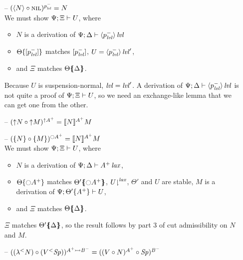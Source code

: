 \begin{itemize}
\item[--] $(\subst{\tetan{N}}{\tnil})^{p^-_\mlvl} = N$\smallskip\\
   We must show $\foc{\Psi}{\Xi}{U}$, where
   \begin{itemize}
   \item $N$ is a derivation of $\foc{\Psi}{\Delta}{\islvl{\susp{p^-_\mlvl}}}$
   \item $\tackon{\Theta}{[p^-_\mlvl]}$ matches $[p^-_\mlvl]$,
      $U = \islvl{\susp{p^-_\mlvl}}'$,
   \item and $\Xi$ matches $\frameoff{\Theta}{\Delta}$.
   \end{itemize}
   Because $U$ is suspension-normal, $\mlvl = \mlvl'$.
   A derivation of $\foc{\Psi}{\Delta}{\islvl{\susp{p^-_\mlvl}}}$ is not
   quite a proof of $\foc{\Psi}{\Xi}{U}$, so we need an exchange-like 
   lemma that we can get one from the other. \smallskip

\newpage

\item[--] $(\subst{\tupr{N}}{\tupl{M}})^{{\uparrow}A^+} = \lsubsta{N}{M}{A^+}$

\item[--] $(\subst{\tlaxr{N}}{\tlaxl{M}})^{{\ocircle}A^+}
           = \lsubsta{N}{M}{A^+}$\smallskip\\
  We must show $\foc{\Psi}{\Xi}{U}$, where
  \begin{itemize}
  \item $N$ is a derivation of 
     $\foc{\Psi}{\Delta}{\islax{A^+}}$, 
  \item $\tackon{\Theta}{{\ocircle}A^+}$ matches 
     $\frameoff{\Theta'}{{\ocircle}A^+}$, 
     $\restrictfrom{U}{\mlax}$, 
     $\Theta'$ and $U$ are stable, 
     $M$ is a derivation of $\foc{\Psi}{\tackon{\Theta'}{A^+}}{U}$,
  \item and $\Xi$ matches $\frameoff{\Theta}{\Delta}$.
  \end{itemize}
  $\Xi$ matches $\frameoff{\Theta'}{\Delta}$, so the result follows
  by part 3 of cut admissibility on $N$ and $M$. \smallskip

\item[--] $(\subst{(\tlaml{N})}{(\tappl{V}{\Sp})})^{A^+ \lefti B^-}
           = (\subst{(\subst{V}{N})^{A^+}}{\Sp})^{B^-}$


\end{itemize}
